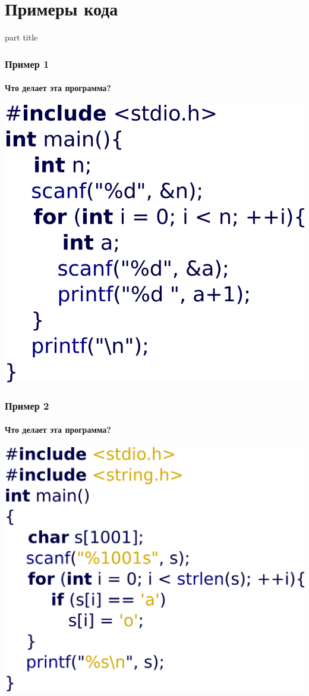 \documentclass[14pt,pdf,hyperref={unicode}]{beamer}
\begin{document}
\section{Примеры кода}
\begin{frame}
\begin{center}
\begin{beamercolorbox}[sep=8pt,center]{part
title}
\insertsection
\end{beamercolorbox}
\end{center}
\end{frame}

\begin{frame}[fragile]
\frametitle{Пример 1} 
\framesubtitle{Что делает эта программа?}
\begin{center}
\includegraphics[width=0.62\linewidth]{images/example1.png}
\end{center}
\end{frame}

\begin{frame}[fragile]
\frametitle{Пример 2} 
\framesubtitle{Что делает эта программа?}
\begin{center}
\includegraphics[width=0.62\linewidth]{images/example2.png}
\end{center}
\end{frame}
\end{document}
